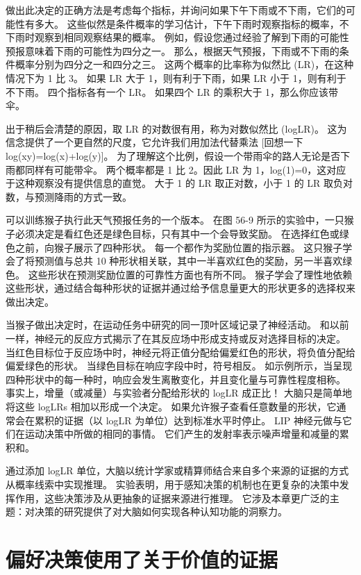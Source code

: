 做出此决定的正确方法是考虑每个指标，并询问如果下午下雨或不下雨，它们的可能性有多大。 这些似然是条件概率的学习估计，下午下雨时观察指标的概率，不下雨时观察到相同观察结果的概率。 例如，假设您通过经验了解到下雨的可能性预报意味着下雨的可能性为四分之一。 那么，根据天气预报，下雨或不下雨的条件概率分别为四分之一和四分之三。 这两个概率的比率称为似然比 (LR)，在这种情况下为 1 比 3。 如果 LR 大于 1，则有利于下雨，如果 LR 小于 1，则有利于不下雨。 四个指标各有一个 LR。 如果四个 LR 的乘积大于 1，那么你应该带伞。

出于稍后会清楚的原因，取 LR 的对数很有用，称为对数似然比 (logLR)。 这为信念提供了一个更自然的尺度，它允许我们用加法代替乘法 [回想一下 log(xy)=log(x)+log(y)]。 为了理解这个比例，假设一个带雨伞的路人无论是否下雨都同样有可能带伞。 两个概率都是 1 比 2。因此 LR 为 1，log(1)=0，这对应于这种观察没有提供信息的直觉。 大于 1 的 LR 取正对数，小于 1 的 LR 取负对数，与预测降雨的方式一致。

可以训练猴子执行此天气预报任务的一个版本。 在图 56-9 所示的实验中，一只猴子必须决定是看红色还是绿色目标，只有其中一个会导致奖励。 在选择红色或绿色之前，向猴子展示了四种形状。 每一个都作为奖励位置的指示器。 这只猴子学会了将预测值与总共 10 种形状相关联，其中一半喜欢红色的奖励，另一半喜欢绿色。 这些形状在预测奖励位置的可靠性方面也有所不同。 猴子学会了理性地依赖这些形状，通过结合每种形状的证据并通过给予信息量更大的形状更多的选择权来做出决定。

当猴子做出决定时，在运动任务中研究的同一顶叶区域记录了神经活动。 和以前一样，神经元的反应方式揭示了在其反应场中形成支持或反对选择目标的决定。 当红色目标位于反应场中时，神经元将正值分配给偏爱红色的形状，将负值分配给偏爱绿色的形状。 当绿色目标在响应字段中时，符号相反。 如示例所示，当呈现四种形状中的每一种时，响应会发生离散变化，并且变化量与可靠性程度相称。 事实上，增量（或减量）与实验者分配给形状的 logLR 成正比！ 大脑只是简单地将这些 logLRs 相加以形成一个决定。 如果允许猴子查看任意数量的形状，它通常会在累积的证据（以 logLR 为单位）达到标准水平时停止。 LIP 神经元做与它们在运动决策中所做的相同的事情。 它们产生的发射率表示噪声增量和减量的累积和。

通过添加 logLR 单位，大脑以统计学家或精算师结合来自多个来源的证据的方式从概率线索中实现推理。 实验表明，用于感知决策的机制也在更复杂的决策中发挥作用，这些决策涉及从更抽象的证据来源进行推理。 它涉及本章更广泛的主题：对决策的研究提供了对大脑如何实现各种认知功能的洞察力。

\section{偏好决策使用了关于价值的证据}


